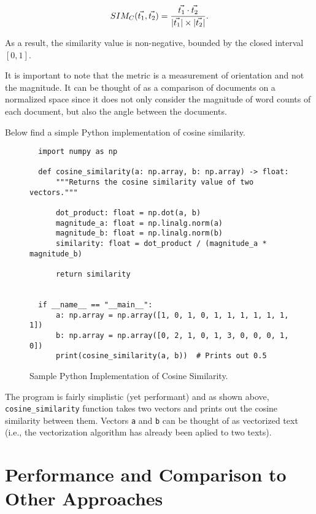 \documentclass[11pt]{article}
\DeclarePairedDelimiter\abs{\lvert}{\rvert}
\begin{document}
\[SIM_C(\vec{t_1}, \vec{t_2}) = \dfrac{\vec{t_1} \cdot
  \vec{t_2}}{\abs{\vec{t_1}} \times \abs{\vec{t_2}}}.\]

As a result, the similarity value is non-negative, bounded by the closed
interval \([0,1]\).

\bigskip

It is important to note that the metric is a measurement of orientation and not
the magnitude. It can be thought of as a comparison of documents on a
normalized space since it does not only consider the magnitude of word counts
of each document, but also the angle between the documents.

\bigskip

Below find a simple Python implementation of cosine similarity.

\begin{figure}[H]
  \begin{verbatim}
  import numpy as np

  def cosine_similarity(a: np.array, b: np.array) -> float:
      """Returns the cosine similarity value of two vectors."""

      dot_product: float = np.dot(a, b)
      magnitude_a: float = np.linalg.norm(a)
      magnitude_b: float = np.linalg.norm(b)
      similarity: float = dot_product / (magnitude_a * magnitude_b)

      return similarity


  if __name__ == "__main__":
      a: np.array = np.array([1, 0, 1, 0, 1, 1, 1, 1, 1, 1, 1])
      b: np.array = np.array([0, 2, 1, 0, 1, 3, 0, 0, 0, 1, 0])
      print(cosine_similarity(a, b))  # Prints out 0.5
  \end{verbatim}
  \caption{Sample Python Implementation of Cosine Similarity.}
\end{figure}

The program is fairly simplistic (yet performant) and as shown above,
\texttt{cosine_similarity} function takes two vectors and prints
out the cosine similarity between them. Vectors \texttt{a} and
\texttt{b} can be thought of as vectorized text (i.e., the
vectorization algorithm has already been aplied to two texts).


\section{Performance and Comparison to Other Approaches}
\end{document}
